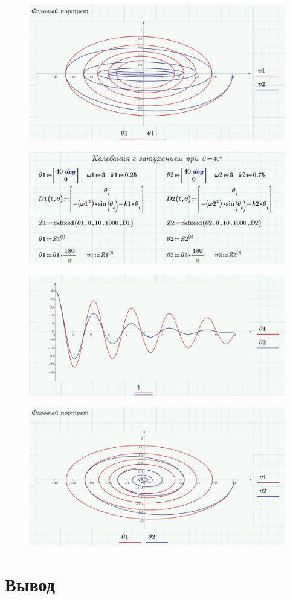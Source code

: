 \documentclass[a4paper, 14pt]{extarticle}
\begin{document}
		\begin{figure}[H]
			\centering
			\includegraphics[width = \linewidth]{12.jpg}
		\end{figure}
		\begin{figure}[H]
			\centering
			\includegraphics[width = \linewidth]{13.jpg}
		\end{figure}
		\begin{figure}[H]
			\centering
			\includegraphics[width = \linewidth]{14.jpg}
		\end{figure}
		\begin{figure}[H]
			\centering
			\includegraphics[width = \linewidth]{15.jpg}
		\end{figure}
		
	\section{Вывод}
		
		
\end{document}
